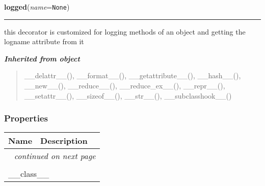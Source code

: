     \label{etude:utils:mylogging:LoggedClass:logged}

    \vspace{0.5ex}

\hspace{.8\funcindent}\begin{boxedminipage}{\funcwidth}

    \raggedright \textbf{logged}(\textit{name}={\tt None})

    \vspace{-1.5ex}

    \rule{\textwidth}{0.5\fboxrule}
\setlength{\parskip}{2ex}
    this decorator is customized for logging methods of an object and 
    getting the logname attribute from it

\setlength{\parskip}{1ex}
    \end{boxedminipage}


\large{\textbf{\textit{Inherited from object}}}

\begin{quote}
\_\_delattr\_\_(), \_\_format\_\_(), \_\_getattribute\_\_(), \_\_hash\_\_(), \_\_new\_\_(), \_\_reduce\_\_(), \_\_reduce\_ex\_\_(), \_\_repr\_\_(), \_\_setattr\_\_(), \_\_sizeof\_\_(), \_\_str\_\_(), \_\_subclasshook\_\_()
\end{quote}


  \subsubsection{Properties}

    \vspace{-1cm}
\hspace{\varindent}\begin{longtable}{|p{\varnamewidth}|p{\vardescrwidth}|l}
\cline{1-2}
\cline{1-2} \centering \textbf{Name} & \centering \textbf{Description}& \\
\cline{1-2}
\endhead\cline{1-2}\multicolumn{3}{r}{\small\textit{continued on next page}}\\\endfoot\cline{1-2}
\endlastfoot\multicolumn{2}{|l|}{\textit{Inherited from object}}\\
\multicolumn{2}{|p{\varwidth}|}{\raggedright \_\_class\_\_}\\
\cline{1-2}
\end{longtable}


